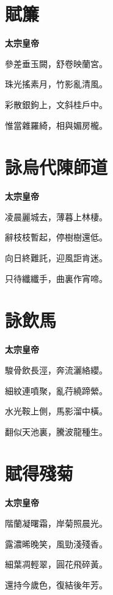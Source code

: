 \documentclass[12pt,a4paper]{ctexbook}
\begin{document}
\section{賦簾}
\textbf{太宗皇帝}\par\vspace{0.5em}
參差垂玉闕，舒卷映蘭宮。\par
珠光搖素月，竹影亂清風。\par
彩散銀鉤上，文斜桂戶中。\par
惟當雜羅綺，相與媚房櫳。\par

\section{詠烏代陳師道}
\textbf{太宗皇帝}\par\vspace{0.5em}
凌晨麗城去，薄暮上林棲。\par
辭枝枝暫起，停樹樹還低。\par
向日終難託，迎風詎肯迷。\par
只待纖纖手，曲裏作宵啼。\par

\section{詠飲馬}
\textbf{太宗皇帝}\par\vspace{0.5em}
駿骨飲長涇，奔流灑絡纓。\par
細紋連噴聚，亂荇繞蹄縈。\par
水光鞍上側，馬影溜中橫。\par
翻似天池裏，騰波龍種生。\par

\section{賦得殘菊}
\textbf{太宗皇帝}\par\vspace{0.5em}
階蘭凝曙霜，岸菊照晨光。\par
露濃晞晚笑，風勁淺殘香。\par
細葉凋輕翠，圓花飛碎黃。\par
還持今歲色，復結後年芳。\par
\end{document}
